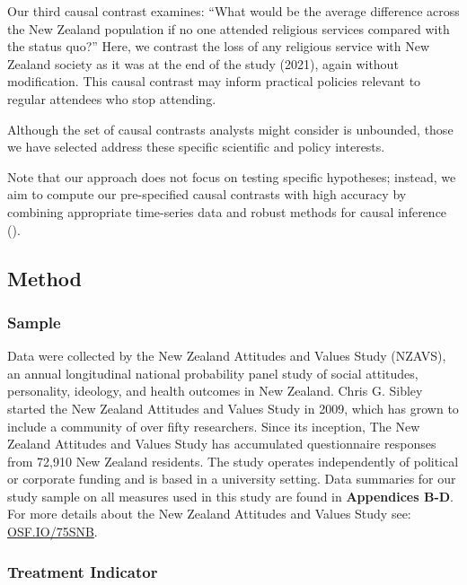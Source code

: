 \documentclass[
  single column]{article}
\begin{document}
Our third causal contrast examines: ``What would be the average
difference across the New Zealand population if no one attended
religious services compared with the status quo?'' Here, we contrast the
loss of any religious service with New Zealand society as it was at the
end of the study (2021), again without modification. This causal
contrast may inform practical policies relevant to regular attendees who
stop attending.

Although the set of causal contrasts analysts might consider is
unbounded, those we have selected address these specific scientific and
policy interests.

Note that our approach does not focus on testing specific hypotheses;
instead, we aim to compute our pre-specified causal contrasts with high
accuracy by combining appropriate time-series data and robust methods
for causal inference ().

\subsection{Method}\label{method}

\subsubsection{Sample}\label{sample}

Data were collected by the New Zealand Attitudes and Values Study
(NZAVS), an annual longitudinal national probability panel study of
social attitudes, personality, ideology, and health outcomes in New
Zealand. Chris G. Sibley started the New Zealand Attitudes and Values
Study in 2009, which has grown to include a community of over fifty
researchers. Since its inception, The New Zealand Attitudes and Values
Study has accumulated questionnaire responses from 72,910 New Zealand
residents. The study operates independently of political or corporate
funding and is based in a university setting. Data summaries for our
study sample on all measures used in this study are found in
\textbf{Appendices B-D}. For more details about the New Zealand
Attitudes and Values Study see:
\href{https://doi.org/10.17605/OSF.IO/75SNB}{OSF.IO/75SNB}.

\subsubsection{Treatment Indicator}\label{treatment-indicator}
\end{document}
